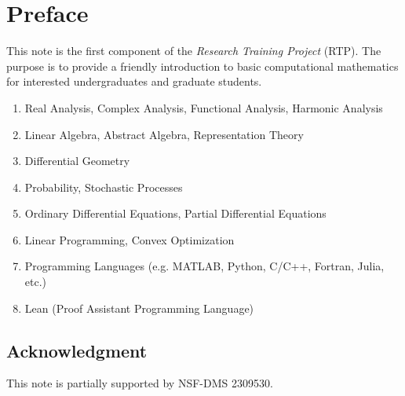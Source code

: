 \chapter*{Preface}

This note is the first component of the \emph{Research Training Project} (RTP).  The purpose is to provide a friendly introduction to basic computational mathematics for interested undergraduates and graduate students. 
\vspace{1cm}

{}

\begin{enumerate}
    \item Real Analysis, Complex Analysis, Functional Analysis, Harmonic Analysis
    \item Linear Algebra, Abstract Algebra, Representation Theory
    \item Differential Geometry
    \item Probability, Stochastic Processes
    \item Ordinary Differential Equations, Partial Differential Equations 
    \item Linear Programming, Convex Optimization
    \item Programming Languages (e.g. MATLAB, Python, C/C++, Fortran, Julia, etc.)
    \item Lean (Proof Assistant Programming Language)
\end{enumerate}

\section*{Acknowledgment}
This note is partially supported by NSF-DMS 2309530.